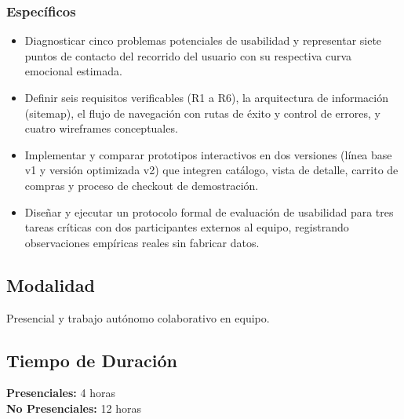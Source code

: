 \documentclass{article}
\begin{document}
\subsubsection{Específicos}
\begin{itemize}
    \item Diagnosticar cinco problemas potenciales de usabilidad y representar siete puntos de contacto del recorrido del usuario con su respectiva curva emocional estimada.
    \item Definir seis requisitos verificables (R1 a R6), la arquitectura de información (sitemap), el flujo de navegación con rutas de éxito y control de errores, y cuatro wireframes conceptuales.
    \item Implementar y comparar prototipos interactivos en dos versiones (línea base v1 y versión optimizada v2) que integren catálogo, vista de detalle, carrito de compras y proceso de checkout de demostración.
    \item Diseñar y ejecutar un protocolo formal de evaluación de usabilidad para tres tareas críticas con dos participantes externos al equipo, registrando observaciones empíricas reales sin fabricar datos.
\end{itemize}

\subsection{Modalidad}
Presencial y trabajo autónomo colaborativo en equipo.

\subsection{Tiempo de Duración}
\textbf{Presenciales:} 4 horas \\
\textbf{No Presenciales:} 12 horas
\end{document}
